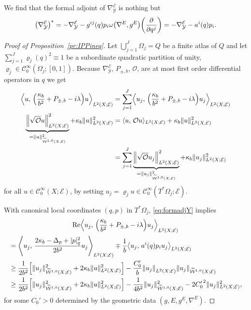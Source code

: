 \documentclass[10pt]{amsart}
\theoremstyle{definition}\newtheorem{defi}[theo]{Definition}\newtheorem{rema}[theo]{Remark}\newtheorem{exam}[theo]{Example}\newtheorem{exem}[theo]{Example}\newtheorem{nota}[theo]{Notation}
\newcommand{\clW}{\mathcal{W}}
\newcommand{\clC}{\mathcal{C}}
\newcommand{\clY}{\mathcal{Y}}
\newcommand{\clO}{\mathcal{O}}
\newcommand{\clE}{\mathcal{E}}
\DeclareMathOperator{\Ree}{Re}
\newcommand\norm[1]{\left\lVert#1\right\rVert}
\let\originalleft\left
\let\originalright\right
\renewcommand{\left}{\mathopen{}\mathclose\bgroup\originalleft}
\renewcommand{\right}{\aftergroup\egroup\originalright}
\begin{document}
We find that the formal adjoint of $\nabla_{\clY}^{\clE}$ is nothing but
\begin{equation}\label{eq:formadjY}
\left(\nabla^{\clE}_{\clY}\right)^{*}=-\nabla^{\clE}_{\clY}-g^{ij}(q)p_{i}\omega\left(\nabla^{E},g^{E}\right)\left(\frac{\partial}{\partial q^{j}}\right) =-\nabla^{\clE}_{\clY}-a^{i}(q)p_{i}.
\end{equation}
\begin{proof}[Proof of Proposition~\ref{pr:IPPineq}]
Let $\bigcup_{j=1}^{J}\Omega_{j}= Q$ be a finite atlas of $Q$ and let $\sum_{j=1}^{J}\varrho_{j}(q)^{2}\equiv 1$ be a subordinate quadratic partition of unity, $\varrho_{j}\in \clC^{\infty}_{0}(\Omega_{j};[0,1])$. Because $\nabla^{\clE}_{\clY}$, $P_{\pm,b}$, $\clO$, are at most first order differential operators in $q$ we get
\begin{align*}
\left\langle u,\, \left(\frac{\kappa_{b}}{b^{2}}+P_{\pm, b}-i\lambda\right)u\right\rangle_{L^{2}(X;\clE)} &=\sum_{j=1}^{J}\left\langle u_{j},\, \left(\frac{\kappa_{b}}{b^{2}}+P_{\pm, b}-i\lambda\right)u_{j}\right\rangle_{L^{2}(X;\clE)}
\\
\underbrace{\left\|\sqrt{\clO}u\right\|_{L^{2}(X;\clE)}^{2}}_{=\|u\|^{2}_{\widetilde{\clW}^{1,0}(X;\clE)}} + \kappa_{b}\|u\|_{L^{2}(X;\clE)}^{2} &=\langle u,\, \clO u\rangle_{L^{2}(X;\clE)}+\kappa_{b}\|u\|_{L^{2}(X,\clE)}^2
\\ &=\sum_{j=1}^{J}\underbrace{\left\|\sqrt{\clO}u_{j}\right\|_{L^{2}(X;\clE)}^{2}}_{=\|u_{j}\|^{2}_{\widetilde{\clW}^{1,0}(X;\clE)}}+ \kappa_{b} \|u_{j}\|_{L^{2}(X;\clE)}^{2}
\end{align*}
for all $u\in \clC^{\infty}_{0}(X;\clE)$, by setting $u_{j}=\varrho_{j}u\in \clC^{\infty}_{0}(T^{*}\Omega_{j};\clE)$.

With canonical local coordinates $(q,p)$ in $T^{*}\Omega_{j}$, \eqref{eq:formadjY} implies
\begin{multline*}
\Ree\left\langle u_{j},\, \left(\frac{\kappa_{b}}{b^{2}}+P_{\pm,b}-i\lambda\right)u_{j}\right\rangle_{L^{2}(X;\clE)}\\
\begin{aligned}
&=
\left\langle u_{j},\, \frac{2\kappa_{b}-\Delta_{p}+|p|_{q}^{2}}{2b^{2}}u_{j}\right\rangle_{L^{2}(X;\clE)}
\mp
\frac{1}{b}\left\langle u_{j},\, a^{i}(q)p_{i}u_{j}\right\rangle_{L^{2}(X;\clE)}
\\
&\geq \frac{1}{2b^{2}}\left[\|u_{j}\|_{\widetilde{\clW}^{1,0}(X;\clE)}^{2}+2\kappa_{b}\|u\|^{2}_{L^{2}(X;\clE)}\right]-\frac{C_{0}'}{b}\norm{u_{j}}_{L^{2}(X;\clE)}
\|u_{j}\|_{\widetilde{\clW}^{1,0}(X;\clE)}
\\ &\geq
\frac{1}{2b^{2}}\left[\|u_{j}\|_{\widetilde{\clW}^{1,0}(X;\clE)}^{2}+2\kappa_{b}\|u\|^{2}_{L^{2}(X;\clE)}\right]
-\frac{1}{4b^{2}}\|u_{j}\|_{\widetilde{\clW}^{1,0}(X;\clE)}^{2} -2{C_{0}'}^{2}\|u_{j}\|_{L^{2}(X;\clE)}^{2},
\end{aligned}
\end{multline*}
for some $C_{0}'>0$ determined by the geometric data $(g,E,g^{E},\nabla^{E})$.


\end{proof}
\end{document}
